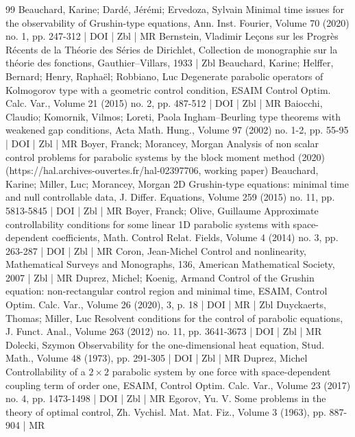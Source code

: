 \begin{thebibliography}{99}
Beauchard, Karine; Dardé, Jérémi; Ervedoza, Sylvain Minimal time issues for the observability of Grushin-type equations, Ann. Inst. Fourier, Volume 70 (2020) no. 1, pp. 247-312 | DOI | Zbl | MR
Bernstein, Vladimir Leçons sur les Progrès Récents de la Théorie des Séries de Dirichlet, Collection de monographie sur la théorie des fonctions, Gauthier–Villars, 1933 | Zbl
Beauchard, Karine; Helffer, Bernard; Henry, Raphaël; Robbiano, Luc Degenerate parabolic operators of Kolmogorov type with a geometric control condition, ESAIM Control Optim. Calc. Var., Volume 21 (2015) no. 2, pp. 487-512 | DOI | Zbl | MR
Baiocchi, Claudio; Komornik, Vilmos; Loreti, Paola Ingham–Beurling type theorems with weakened gap conditions, Acta Math. Hung., Volume 97 (2002) no. 1-2, pp. 55-95 | DOI | Zbl | MR
Boyer, Franck; Morancey, Morgan Analysis of non scalar control problems for parabolic systems by the block moment method (2020) (https://hal.archives-ouvertes.fr/hal-02397706, working paper)
Beauchard, Karine; Miller, Luc; Morancey, Morgan 2D Grushin-type equations: minimal time and null controllable data, J. Differ. Equations, Volume 259 (2015) no. 11, pp. 5813-5845 | DOI | Zbl | MR
Boyer, Franck; Olive, Guillaume Approximate controllability conditions for some linear 1D parabolic systems with space-dependent coefficients, Math. Control Relat. Fields, Volume 4 (2014) no. 3, pp. 263-287 | DOI | Zbl | MR
Coron, Jean-Michel Control and nonlinearity, Mathematical Surveys and Monographs, 136, American Mathematical Society, 2007 | Zbl | MR
Duprez, Michel; Koenig, Armand Control of the Grushin equation: non-rectangular control region and minimal time, ESAIM, Control Optim. Calc. Var., Volume 26 (2020), 3, p. 18 | DOI | MR | Zbl
Duyckaerts, Thomas; Miller, Luc Resolvent conditions for the control of parabolic equations, J. Funct. Anal., Volume 263 (2012) no. 11, pp. 3641-3673 | DOI | Zbl | MR
Dolecki, Szymon Observability for the one-dimensional heat equation, Stud. Math., Volume 48 (1973), pp. 291-305 | DOI | Zbl | MR
Duprez, Michel Controllability of a $2\times 2$ parabolic system by one force with space-dependent coupling term of order one, ESAIM, Control Optim. Calc. Var., Volume 23 (2017) no. 4, pp. 1473-1498 | DOI | Zbl | MR
Egorov, Yu. V. Some problems in the theory of optimal control, Zh. Vychisl. Mat. Mat. Fiz., Volume 3 (1963), pp. 887-904 | MR

\end{thebibliography}
